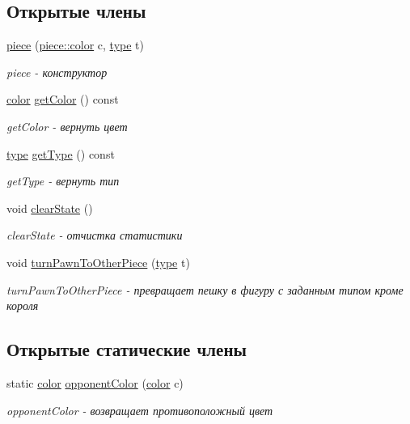 \subsection*{Открытые члены}
\begin{DoxyCompactItemize}
\item 
\hyperlink{classpiece_ab950ed5525196aa83c59cfe04f5891db}{piece} (\hyperlink{classpiece_a0e121e5952345fd0e7014a8e6a1fbbda}{piece\+::color} c, \hyperlink{classpiece_a60bdcec91f595c164fe08c6705f192d0}{type} t)
\begin{DoxyCompactList}\small\item\em piece -\/ конструктор \end{DoxyCompactList}\item 
\hyperlink{classpiece_a0e121e5952345fd0e7014a8e6a1fbbda}{color} \hyperlink{classpiece_a71cc356d37aaadad54d0c20714a4f407}{get\+Color} () const 
\begin{DoxyCompactList}\small\item\em get\+Color -\/ вернуть цвет \end{DoxyCompactList}\item 
\hyperlink{classpiece_a60bdcec91f595c164fe08c6705f192d0}{type} \hyperlink{classpiece_a60c80dd266bdd0a51df294263ee639d4}{get\+Type} () const 
\begin{DoxyCompactList}\small\item\em get\+Type -\/ вернуть тип \end{DoxyCompactList}\item 
\hypertarget{classpiece_a72b1969c42c8fa89f41cb8c54b2438c3}{}void \hyperlink{classpiece_a72b1969c42c8fa89f41cb8c54b2438c3}{clear\+State} ()\label{classpiece_a72b1969c42c8fa89f41cb8c54b2438c3}

\begin{DoxyCompactList}\small\item\em clear\+State -\/ отчистка статистики \end{DoxyCompactList}\item 
void \hyperlink{classpiece_a4771f62c2b12989f5051d7e96387159f}{turn\+Pawn\+To\+Other\+Piece} (\hyperlink{classpiece_a60bdcec91f595c164fe08c6705f192d0}{type} t)
\begin{DoxyCompactList}\small\item\em turn\+Pawn\+To\+Other\+Piece -\/ превращает пешку в фигуру с заданным типом кроме короля \end{DoxyCompactList}\end{DoxyCompactItemize}
\subsection*{Открытые статические члены}
\begin{DoxyCompactItemize}
\item 
static \hyperlink{classpiece_a0e121e5952345fd0e7014a8e6a1fbbda}{color} \hyperlink{classpiece_abc6324159644ab0c0aad7f2c84e122e5}{opponent\+Color} (\hyperlink{classpiece_a0e121e5952345fd0e7014a8e6a1fbbda}{color} c)
\begin{DoxyCompactList}\small\item\em opponent\+Color -\/ возвращает противоположный цвет \end{DoxyCompactList}\end{DoxyCompactItemize}
